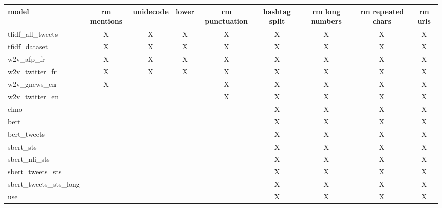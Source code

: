 \begin{tabular}{lcccccccc}
\hline
                 model & rm mentions & unidecode & lower & rm punctuation & hashtag split & rm long numbers & rm repeated chars & rm urls \\
\hline
      tfidf\_all\_tweets &           X &         X &     X &              X &             X &               X &                 X &       X \\
         tfidf\_dataset &           X &         X &     X &              X &             X &               X &                 X &       X \\
            w2v\_afp\_fr &           X &         X &     X &              X &             X &               X &                 X &       X \\
        w2v\_twitter\_fr &           X &         X &     X &              X &             X &               X &                 X &       X \\
          w2v\_gnews\_en &           X &           &       &              X &             X &               X &                 X &       X \\
        w2v\_twitter\_en &             &           &       &              X &             X &               X &                 X &       X \\
                  elmo &             &           &       &                &             X &               X &                 X &       X \\
                  bert &             &           &       &                &             X &               X &                 X &       X \\
           bert\_tweets &             &           &       &                &             X &               X &                 X &       X \\
             sbert\_sts &             &           &       &                &             X &               X &                 X &       X \\
         sbert\_nli\_sts &             &           &       &                &             X &               X &                 X &       X \\
      sbert\_tweets\_sts &             &           &       &                &             X &               X &                 X &       X \\
 sbert\_tweets\_sts\_long &             &           &       &                &             X &               X &                 X &       X \\
                   use &             &           &       &                &             X &               X &                 X &       X \\
\hline
\end{tabular}
